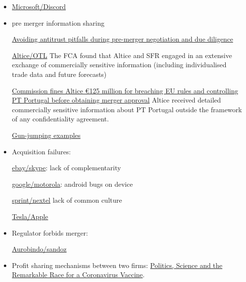 \documentclass[a4paper,leqno]{article}%
\begin{document}
\begin{itemize}
    \item \href{https://www.lemonde.fr/economie/article/2021/04/08/microsoft-convoite-le-service-de-discussion-discord_6076070_3234.html}{Microsoft/Discord}
    \item pre merger information sharing
    
    \href{https://www.ftc.gov/news-events/blogs/competition-matters/2018/03/avoiding-antitrust-pitfalls-during-pre-merger}{Avoiding antitrust pitfalls during pre-merger negotiation and due diligence}
    
    \href{https://sites-herbertsmithfreehills.vuturevx.com/46/12874/compose-email/the-altice-case-a-costly-warning-not-to-engage-in-gun-jumping-before-receiving-merger-control-clearance.asp}{Altice/OTL} The FCA found that Altice and SFR engaged in an extensive exchange of commercially sensitive information (including individualised trade data and future forecasts)
    
    \href{https://ec.europa.eu/commission/presscorner/detail/en/IP_18_3522}{Commission fines Altice €125 million for breaching EU rules and controlling PT Portugal before obtaining merger approval} Altice received detailed commercially sensitive information about PT Portugal outside the framework of any confidentiality agreement.
    
    \href{https://www.twobirds.com/en/news/articles/2020/global/double-caution-gun-jumping-risks-in-m-and-a-transactions}{Gun-jumping examples}
    \item Acquisition failures:
    
    \href{https://www.investopedia.com/articles/insights/061816/4-cases-when-ma-strategy-failed-acquirer-ebay-bac.asp}{ebay/skype}: lack of complementarity
    
    \href{https://salessynergy.net/the-biggest-acquisition-disasters-that-put-companies-into-quite-a-bit-of-trouble/}{google/motorola}: android bugs on device
    
    \href{https://www.investopedia.com/articles/financial-theory/08/merger-acquisition-disasters.asp#:~:text=The\%20consolidation\%20of\%20AOL\%20Time,combination\%20up\%20until\%20that\%20time}{sprint/nextel} lack of common culture
    
    \href{https://www.theguardian.com/technology/2020/dec/23/elon-musk-i-tried-to-sell-tesla-to-apple?CMP=Share_iOSApp_Other}{Tesla/Apple}

    
    \item Regulator forbids merger:
    
    \href{https://www.livemint.com/companies/news/aurobindo-pharma-calls-off-1-billion-deal-with-sandoz-after-failing-to-get-ftc-nod-11585801128011.html}{Aurobindo/sandoz}
    
    \item Profit sharing mechanisms between two firms: \href{https://www.nytimes.com/2020/11/21/us/politics/coronavirus-vaccine.html?referringSource=articleShare}{Politics, Science and the Remarkable Race for a Coronavirus Vaccine}.
\end{itemize}
\end{document}
